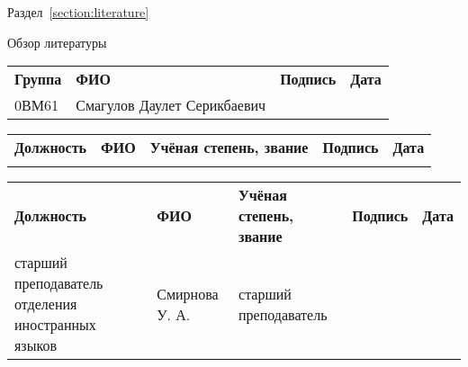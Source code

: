 \begingroup
\singlespacing
\centering
\small
{}
\renewcommand\tabularxcolumn[1]{p{#1}}

\vspace{\fill}
\vspace{\fill}

Раздел~\ref{section:literature}

Обзор литературы

\vspace{\fill}

\begin{tabularx}{\textwidth}
{|>{\hsize}Y|>{\hsize}Y|>{\hsize}Y|>{\hsize}Y|}
     \\
    \hline
    \scriptsize \textbf{Группа}
        & \scriptsize \textbf{ФИО}
        & \scriptsize \textbf{Подпись}
        & \scriptsize \textbf{Дата} \\
    \hline 
    0ВМ61\bigstrut & Смагулов Даулет Серикбаевич & & \\ 
    \hline
\end{tabularx}

\vspace{2ex}

\begin{tabularx}{\textwidth}
{|>{\hsize}Y|>{\hsize}Y|>{\hsize}Y|>{\hsize}Y|>{\hsize}Y|}
     \\
    \hline
    \scriptsize \textbf{Должность} 
        & \scriptsize \textbf{ФИО} 
        & \scriptsize \textbf{Учёная степень, звание} 
        & \scriptsize \textbf{Подпись} 
        & \scriptsize \textbf{Дата} \\
    \hline
    & {}\bigstrut & & & \\ 
    \hline
\end{tabularx}

\vspace{2ex}

\begin{tabularx}{\textwidth}
{|>{\hsize}Y|>{\hsize}Y|>{\hsize}Y|>{\hsize}Y|>{\hsize}Y|}
     \\
    \hline
    \scriptsize \textbf{Должность} 
        & \scriptsize \textbf{ФИО} 
        & \scriptsize \textbf{Учёная степень, звание} 
        & \scriptsize \textbf{Подпись} 
        & \scriptsize \textbf{Дата} \\
    \hline
    старший преподаватель отделения иностранных языков & Смирнова У. А.\bigstrut & старший преподаватель & & \\ 
    \hline
\end{tabularx}

